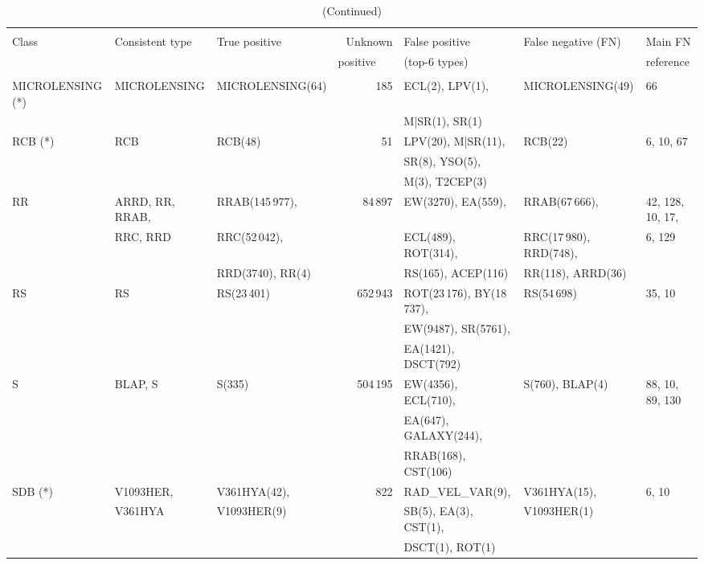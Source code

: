 \documentclass[longauth]{aa}
\begin{document}
\setcounter{table}{2}
\begin{landscape}
\begin{table}  
\caption{(Continued)} 
\centering                 
\begin{tabular}{@{}lllrlll@{}}     
\hline\hline & \\[-2.0ex]                 
Class & Consistent type & True positive & Unknown  & False positive & False negative (FN) & Main FN \\
      &  & &  positive~~~ & (top-6 types)  &  & reference \\
\hline & \\[-1.5ex]
MICROLENSING (*) & MICROLENSING & MICROLENSING(64) & 185 & ECL(2), LPV(1), & MICROLENSING(49) & 66  \\
                 &              &  &  & M|SR(1), SR(1) &  &   \\
RCB (*) & RCB & RCB(48) & 51 & LPV(20),  M|SR(11), & RCB(22) & 6, 10, 67  \\
        &     &  &  & SR(8), YSO(5), &  &   \\
        &     &  &  & M(3), T2CEP(3) &  &   \\
RR & ARRD, RR, RRAB, & RRAB(145\,977),  & 84\,897 & EW(3270), EA(559), & RRAB(67\,666), & 42, 128, 10, 17,  \\
   & RRC, RRD        & RRC(52\,042),    &  & ECL(489), ROT(314), & RRC(17\,980), RRD(748), & 6, 129  \\
   &                 & RRD(3740), RR(4) &  & RS(165), ACEP(116) & RR(118), ARRD(36) &   \\
RS & RS & RS(23\,401) & 652\,943 & ROT(23\,176), BY(18\,737), & RS(54\,698) & 35, 10  \\
   &    &             &          & EW(9487), SR(5761), &  &   \\
   &    &             &          & EA(1421), DSCT(792) &  &   \\
S & BLAP, S & S(335) & 504\,195 & EW(4356), ECL(710), & S(760), BLAP(4) & 88, 10, 89, 130   \\
  &       &          &          & EA(647), GALAXY(244), &  &   \\
  &       &          &          & RRAB(168), CST(106) &  &   \\
SDB (*) & V1093HER, & V361HYA(42), & 822  & RAD\_VEL\_VAR(9), & V361HYA(15), & 6, 10  \\
        & V361HYA   & V1093HER(9) &  & SB(5), EA(3), CST(1), & V1093HER(1) &   \\
        &           &             &  & DSCT(1), ROT(1) &  &   \\

\end{tabular}
\end{table}
\end{landscape}
\end{document}
